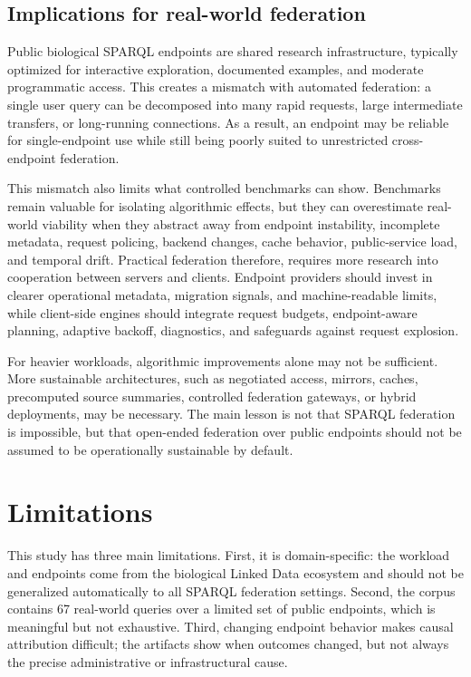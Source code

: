 \documentclass[runningheads]{llncs}
\begin{document}
\subsection{Implications for real-world federation}\label{sec6.3}

Public biological SPARQL endpoints are shared research infrastructure, typically optimized for interactive exploration, documented examples, and moderate programmatic access. 
This creates a mismatch with automated federation: a single user query can be decomposed into many rapid requests, large intermediate transfers, or long-running connections. 
As a result, an endpoint may be reliable for single-endpoint use while still being poorly suited to unrestricted cross-endpoint federation.

This mismatch also limits what controlled benchmarks can show. 
Benchmarks remain valuable for isolating algorithmic effects, but they can overestimate real-world viability when they abstract away from endpoint instability, incomplete metadata, request policing, backend changes, cache behavior, public-service load, and temporal drift. 
Practical federation therefore, requires more research into cooperation between servers and clients. 
Endpoint providers should invest in clearer operational metadata, migration signals, and machine-readable limits, while client-side engines should integrate request budgets, endpoint-aware planning, adaptive backoff, diagnostics, and safeguards against request explosion.

For heavier workloads, algorithmic improvements alone may not be sufficient. 
More sustainable architectures, such as negotiated access, mirrors, caches, precomputed source summaries, controlled federation gateways, or hybrid deployments, may be necessary. 
The main lesson is not that SPARQL federation is impossible, but that open-ended federation over public endpoints should not be assumed to be operationally sustainable by default.

\section{Limitations}\label{sec7}
This study has three main limitations. 
First, it is domain-specific: the workload and endpoints come from the biological Linked Data ecosystem and should not be generalized automatically to all SPARQL federation settings. 
Second, the corpus contains 67 real-world queries over a limited set of public endpoints, which is meaningful but not exhaustive. 
Third, changing endpoint behavior makes causal attribution difficult; the artifacts show when outcomes changed, but not always the precise administrative or infrastructural cause.
\end{document}
